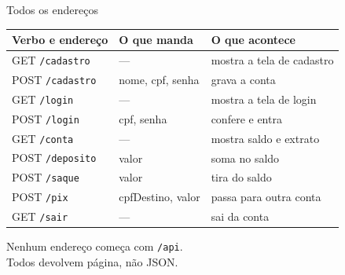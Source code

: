 \documentclass[aspectratio=169,11pt]{beamer}
\begin{document}
\begin{frame}{Todos os endereços}
  \begin{center}
  \small
  \begin{tabular}{lll}
    \toprule
    Verbo e endereço & O que manda & O que acontece \\
    \midrule
    GET \texttt{/cadastro} & --- & mostra a tela de cadastro \\
    POST \texttt{/cadastro} & nome, cpf, senha & grava a conta \\
    GET \texttt{/login} & --- & mostra a tela de login \\
    POST \texttt{/login} & cpf, senha & confere e entra \\
    GET \texttt{/conta} & --- & mostra saldo e extrato \\
    POST \texttt{/deposito} & valor & soma no saldo \\
    POST \texttt{/saque} & valor & tira do saldo \\
    POST \texttt{/pix} & cpfDestino, valor & passa para outra conta \\
    GET \texttt{/sair} & --- & sai da conta \\
    \bottomrule
  \end{tabular}
  \end{center}

  \vspace{0.3em}
  Nenhum endereço começa com \texttt{/api}.\\
  Todos devolvem página, não JSON.
\end{frame}
\end{document}
